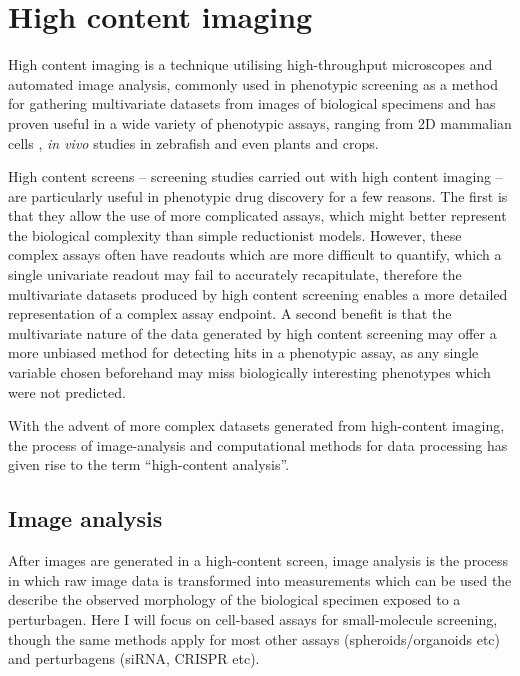 \documentclass[a4paper,11pt,twoside,openright]{scrbook}
\begin{document}



\section{High content imaging}
High content imaging is a technique utilising high-throughput microscopes and automated image analysis, commonly used in phenotypic screening as a method for gathering multivariate datasets from images of biological specimens and has proven useful in a wide variety of phenotypic assays, ranging from 2D mammalian cells \cite{cite_HCA_cell_papers}, \textit{in vivo} studies in zebrafish \cite{GeoffreyBurns2005} and even plants and crops. \cite{Chen2014}

High content screens -- screening studies carried out with high content imaging -- are particularly useful in phenotypic drug discovery for a few reasons.
The first is that they allow the use of more complicated assays, which might better represent the biological complexity than simple reductionist models.
However, these complex assays often have readouts which are more difficult to quantify, which a single univariate readout may fail to accurately recapitulate,
therefore the multivariate datasets produced by high content screening enables a more detailed representation of a complex assay endpoint.
A second benefit is that the multivariate nature of the data generated by high content screening may offer a more unbiased method for detecting hits in a phenotypic assay, as any single variable chosen beforehand may miss biologically interesting phenotypes which were not predicted.

With the advent of more complex datasets generated from high-content imaging, the process of image-analysis and computational methods for data processing has given rise to the term ``high-content analysis''.


\subsection{Image analysis}
After images are generated in a high-content screen, image analysis is the process in which raw image data is transformed into measurements which can be used the describe the observed morphology of the biological specimen exposed to a perturbagen.
Here I will focus on cell-based assays for small-molecule screening, though the same methods apply for most other assays (spheroids/organoids etc) and perturbagens (siRNA, CRISPR etc).
\end{document}
